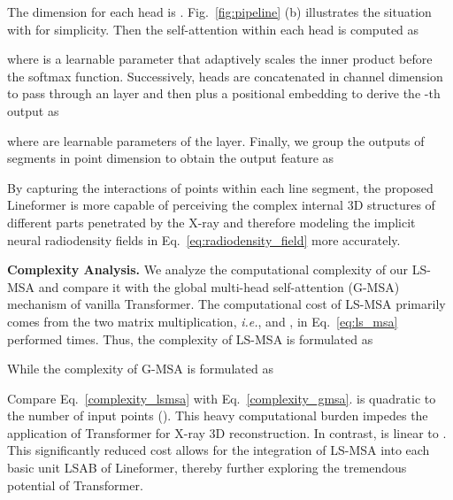 \documentclass[10pt,twocolumn,letterpaper]{article}
\begin{document}
The dimension for each head is . Fig.~\ref{fig:pipeline} (b) illustrates the situation with  for simplicity. Then the self-attention within each head  is computed as
\vspace{-0.6mm}

where  is a learnable parameter that adaptively scales the inner product before the softmax function. Successively,  heads are concatenated in channel dimension to pass through an  layer and then plus a positional embedding  to derive the -th output  as
\vspace{-1.5mm}

where  are learnable parameters of the  layer. Finally, we group the outputs of  segments in point dimension to obtain the output feature  as
\vspace{-0.4mm}

By capturing the interactions of points within each line segment, the proposed Lineformer is more capable of perceiving the complex internal 3D structures of different parts penetrated by the X-ray and therefore modeling the implicit neural radiodensity fields in Eq.~\eqref{eq:radiodensity_field} more accurately.

\vspace{2mm}
\noindent\textbf{Complexity Analysis.} We analyze the computational complexity of our LS-MSA and compare it with the global multi-head self-attention (G-MSA) mechanism of vanilla Transformer. The computational cost of LS-MSA primarily comes from the two matrix multiplication, \emph{i.e.},  and , in Eq.~\eqref{eq:ls_msa} performed  times. Thus, the complexity of LS-MSA is formulated as
\vspace{0.4mm}

While the complexity of G-MSA is formulated as

Compare Eq.~\eqref{complexity_lsmsa} with Eq.~\eqref{complexity_gmsa}.  is quadratic to the number of input points (). This heavy computational burden impedes the application of Transformer for X-ray 3D reconstruction. In contrast,  is linear to . This significantly reduced cost allows for the integration of LS-MSA into each basic unit LSAB of Lineformer, thereby further exploring the tremendous potential of Transformer. 
\end{document}
